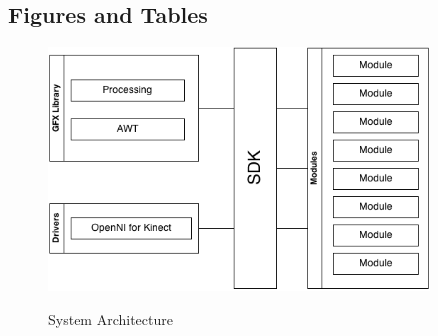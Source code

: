 \documentclass[11pt,letterpaper]{article}
\begin{document}
	\subsection{Figures and Tables}
	\begin{figure}[h!]
		\caption{System Architecture}
		\centering
		\includegraphics[width=0.9\textwidth]{overview}
		\label{fig:system_architecture}
	\end{figure}
	\pagebreak
\end{document}
